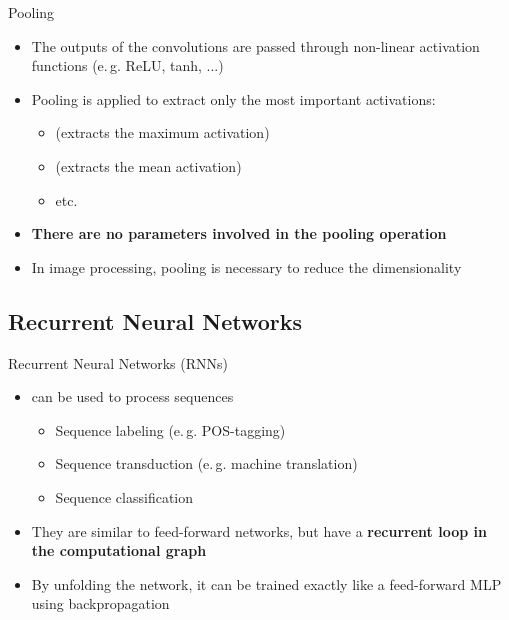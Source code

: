 \begin{frame}{Pooling}{}
	\begin{itemize}
		\item The outputs of the convolutions are passed through non-linear activation functions (e.\,g. ReLU, tanh, ...)
		\item Pooling is applied to extract only the most important activations:
		\begin{itemize}
			\item {} (extracts the maximum activation)
			\item {} (extracts the mean activation)
			\item etc.
		\end{itemize}
		\item \textbf{There are no parameters involved in the pooling operation}
		\item In image processing, pooling is necessary to reduce the dimensionality
	\end{itemize}
\end{frame}


\subsection{Recurrent Neural Networks}

\begin{frame}{Recurrent Neural Networks (RNNs)}{}
	\begin{itemize}
		\item {} can be used to process sequences
		\begin{itemize}
			\item Sequence labeling (e.\,g. POS-tagging)
			\item Sequence transduction (e.\,g. machine translation)
			\item Sequence classification
		\end{itemize}
		\item They are similar to feed-forward networks, but have a \textbf{recurrent loop in the computational graph}
		\item By unfolding the network, it can be trained exactly like a feed-forward MLP using backpropagation
	\end{itemize}
\end{frame}


